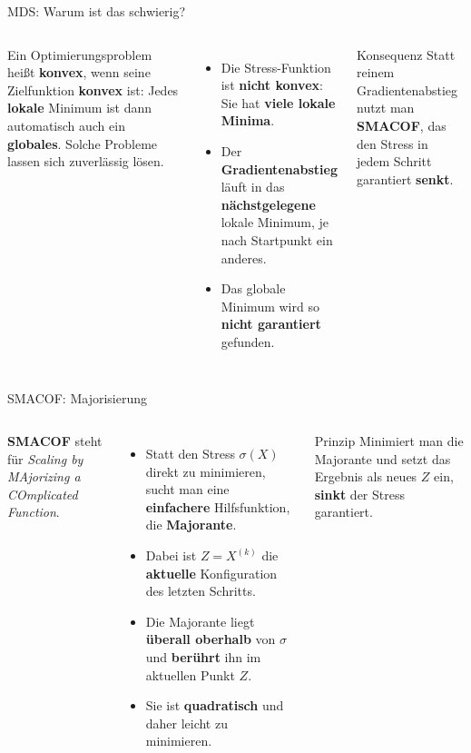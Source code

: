 \begin{frame}{MDS: Warum ist das schwierig?}
\begin{columns}
Ein Optimierungsproblem heißt \textbf{konvex}, wenn seine Zielfunktion
\textbf{konvex} ist: Jedes \textbf{lokale} Minimum ist dann automatisch auch
ein \textbf{globales}. Solche Probleme lassen sich zuverlässig lösen.

\vspace{0.4em}
\begin{itemize}
  \item Die Stress-Funktion ist \textbf{nicht konvex}: Sie hat \textbf{viele
        lokale Minima}.
  \item Der \textbf{Gradientenabstieg} läuft in das \textbf{nächstgelegene}
        lokale Minimum, je nach Startpunkt ein anderes.
  \item Das globale Minimum wird so \textbf{nicht garantiert} gefunden.
\end{itemize}

\begin{blockC2}{Konsequenz}
Statt reinem Gradientenabstieg nutzt man \textbf{SMACOF}, das den Stress in
jedem Schritt garantiert \textbf{senkt}.
\end{blockC2}
\end{columns}
\end{frame}

\begin{frame}{SMACOF: Majorisierung}
\begin{columns}
\textbf{SMACOF} steht für \emph{Scaling by MAjorizing a COmplicated
Function}.

\vspace{0.4em}
\begin{itemize}
  \item Statt den Stress $\sigma(X)$ direkt zu minimieren, sucht man eine
        \textbf{einfachere} Hilfsfunktion, die \textbf{Majorante}.
  \item Dabei ist $Z = X^{(k)}$ die \textbf{aktuelle} Konfiguration des
        letzten Schritts.
  \item Die Majorante liegt \textbf{überall oberhalb} von $\sigma$ und
        \textbf{berührt} ihn im aktuellen Punkt $Z$.
  \item Sie ist \textbf{quadratisch} und daher leicht zu minimieren.
\end{itemize}

\begin{block}{Prinzip}
Minimiert man die Majorante und setzt das Ergebnis als neues $Z$ ein,
\textbf{sinkt} der Stress garantiert.
\end{block}
\end{columns}
\end{frame}

